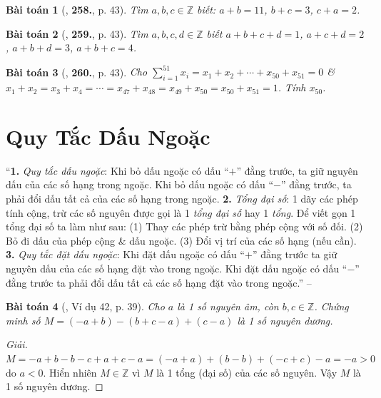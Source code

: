 \documentclass{article}
\numberwithin{equation}{section}
\newtheorem{baitoan}{Bài toán}
\begin{document}
\begin{baitoan}[\cite{Binh_Toan_6_tap_1}, \textbf{258.}, p. 43]
	Tìm $a,b,c\in\mathbb{Z}$ biết: $a + b = 11$, $b + c = 3$, $c + a = 2$.
\end{baitoan}

\begin{baitoan}[\cite{Binh_Toan_6_tap_1}, \textbf{259.}, p. 43]
	Tìm $a,b,c,d\in\mathbb{Z}$ biết $a + b + c + d = 1$, $a + c + d = 2$, $a + b + d = 3$, $a + b + c = 4$.
\end{baitoan}

\begin{baitoan}[\cite{Binh_Toan_6_tap_1}, \textbf{260.}, p. 43]
	Cho $\sum_{i=1}^{51} x_i = x_1 + x_2 + \cdots + x_{50} + x_{51} = 0$ \& $x_1 + x_2 = x_3 + x_4 = \cdots = x_{47} + x_{48} = x_{49} + x_{50} = x_{50} + x_{51} = 1$. Tính $x_{50}$.
\end{baitoan}


\section{Quy Tắc Dấu Ngoặc}
``\textbf{1.} \textit{Quy tắc dấu ngoặc}: Khi bỏ dấu ngoặc có dấu ``$+$'' đằng trước, ta giữ nguyên dấu của các số hạng trong ngoặc. Khi bỏ dấu ngoặc có dấu ``$-$'' đằng trước, ta phải đổi dấu tất cả của các số hạng trong ngoặc. \textbf{2.} \textit{Tổng đại số}: 1 dãy các phép tính cộng, trừ các số nguyên được gọi là 1 \textit{tổng đại số} hay 1 \textit{tổng}. Để viết gọn 1 tổng đại số ta làm như sau: (1) Thay các phép trừ bằng phép cộng với số đối. (2) Bỏ đi dấu của phép cộng \& dấu ngoặc. (3) Đổi vị trí của các số hạng (nếu cần). \textbf{3.} \textit{Quy tắc đặt dấu ngoặc}: Khi đặt dấu ngoặc có dấu ``$+$'' đằng trước ta giữ nguyên dấu của các số hạng đặt vào trong ngoặc. Khi đặt dấu ngoặc có dấu ``$-$'' đằng trước ta phải đổi dấu tất cả các số hạng đặt vào trong ngoặc.'' -- \cite[Chap. II, \S3, p. 39]{Tuyen_Toan_6}

\begin{baitoan}[\cite{Tuyen_Toan_6}, Ví dụ 42, p. 39]
	Cho $a$ là 1 số nguyên âm, còn $b,c\in\mathbb{Z}$. Chứng minh số $M = (-a + b) - (b + c - a) + (c - a)$ là 1 số nguyên dương.
\end{baitoan}

\begin{proof}[Giải]
	$M = -a + b - b - c + a + c - a = (-a + a) + (b - b) + (-c + c) - a = -a > 0$ do $a < 0$. Hiển nhiên $M\in\mathbb{Z}$ vì $M$ là 1 tổng (đại số) của các số nguyên. Vậy $M$ là 1 số nguyên dương.
\end{proof}
\end{document}
